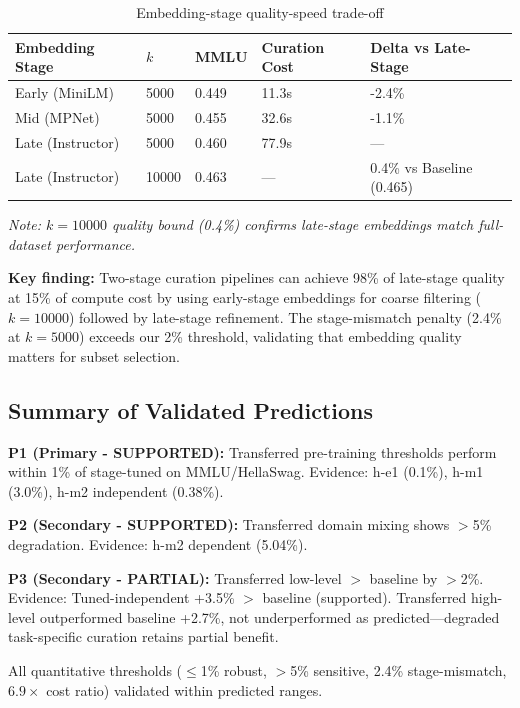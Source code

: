 \begin{table}[h]
\centering
\small
\begin{tabular}{lllll}
\toprule
\textbf{Embedding Stage} & \textbf{$k$} & \textbf{MMLU} & \textbf{Curation Cost} & \textbf{Delta vs Late-Stage} \\
\midrule
Early (MiniLM) & 5000 & 0.449 & 11.3s & -2.4\% \\
Mid (MPNet) & 5000 & 0.455 & 32.6s & -1.1\% \\
Late (Instructor) & 5000 & 0.460 & 77.9s & — \\
Late (Instructor) & 10000 & 0.463 & — & 0.4\% vs Baseline (0.465) \\
\bottomrule
\end{tabular}
\caption{Embedding-stage quality-speed trade-off}
\label{tab:hm3}
\end{table}

\emph{Note: $k=10000$ quality bound (0.4\%) confirms late-stage embeddings match full-dataset performance.}

\textbf{Key finding:} Two-stage curation pipelines can achieve 98\% of late-stage quality at 15\% of compute cost by using early-stage embeddings for coarse filtering ($k=10000$) followed by late-stage refinement. The stage-mismatch penalty (2.4\% at $k=5000$) exceeds our 2\% threshold, validating that embedding quality matters for subset selection.

\subsection{Summary of Validated Predictions}

\textbf{P1 (Primary - SUPPORTED):} Transferred pre-training thresholds perform within 1\% of stage-tuned on MMLU/HellaSwag. Evidence: h-e1 (0.1\%), h-m1 (3.0\%), h-m2 independent (0.38\%).

\textbf{P2 (Secondary - SUPPORTED):} Transferred domain mixing shows $>$5\% degradation. Evidence: h-m2 dependent (5.04\%).

\textbf{P3 (Secondary - PARTIAL):} Transferred low-level $>$ baseline by $>$2\%. Evidence: Tuned-independent +3.5\% $>$ baseline (supported). Transferred high-level outperformed baseline +2.7\%, not underperformed as predicted—degraded task-specific curation retains partial benefit.

All quantitative thresholds ($\leq$1\% robust, $>$5\% sensitive, 2.4\% stage-mismatch, $6.9\times$ cost ratio) validated within predicted ranges.
